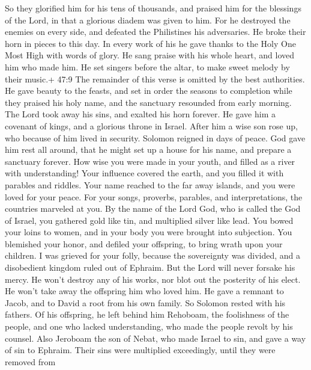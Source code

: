  So they glorified him for his tens of thousands, and
praised him for the blessings of the Lord, in that a glorious diadem was
given to him.  For he destroyed the enemies on every side,
and defeated the Philistines his adversaries. He broke their horn in
pieces to this day.  In every work of his he gave thanks to
the Holy One Most High with words of glory. He sang praise with his
whole heart, and loved him who made him.  He set singers
before the altar, to make sweet melody by their music.+ 47:9 The
remainder of this verse is omitted by the best authorities.
 He gave beauty to the feasts, and set in order the seasons
to completion while they praised his holy name, and the sanctuary
resounded from early morning.  The Lord took away his sins,
and exalted his horn forever. He gave him a covenant of kings, and a
glorious throne in Israel.  After him a wise son rose up,
who because of him lived in security.  Solomon reigned in
days of peace. God gave him rest all around, that he might set up a
house for his name, and prepare a sanctuary forever.  How
wise you were made in your youth, and filled as a river with
understanding!  Your influence covered the earth, and you
filled it with parables and riddles.  Your name reached to
the far away islands, and you were loved for your peace. 
For your songs, proverbs, parables, and interpretations, the countries
marveled at you.  By the name of the Lord God, who is
called the God of Israel, you gathered gold like tin, and multiplied
silver like lead.  You bowed your loins to women, and in
your body you were brought into subjection.  You blemished
your honor, and defiled your offspring, to bring wrath upon your
children. I was grieved for your folly,  because the
sovereignty was divided, and a disobedient kingdom ruled out of Ephraim.
 But the Lord will never forsake his mercy. He won't
destroy any of his works, nor blot out the posterity of his elect. He
won't take away the offspring him who loved him. He gave a remnant to
Jacob, and to David a root from his own family.  So Solomon
rested with his fathers. Of his offspring, he left behind him Rehoboam,
the foolishness of the people, and one who lacked understanding, who
made the people revolt by his counsel. Also Jeroboam the son of Nebat,
who made Israel to sin, and gave a way of sin to Ephraim. 
Their sins were multiplied exceedingly, until they were removed from
